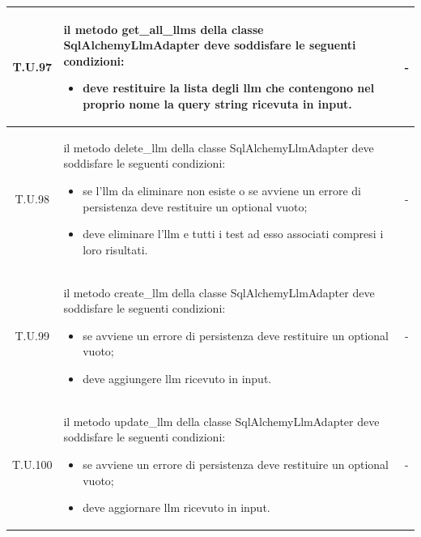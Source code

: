 \begin{tabularx}{\textwidth}{|c|X|c|}
    \hline 
    \label{tu:tu97} T.U.97 & il metodo get\_all\_llms della classe SqlAlchemyLlmAdapter deve soddisfare le seguenti condizioni:
    \begin{itemize}
        \item deve restituire la lista degli llm che contengono nel proprio nome la query string ricevuta in input. 
    \end{itemize} & - \\
    \hline 
    \label{tu:tu98} T.U.98 & il metodo delete\_llm della classe SqlAlchemyLlmAdapter deve soddisfare le seguenti condizioni:
    \begin{itemize}
        \item se l'llm da eliminare non esiste o se avviene un errore di persistenza deve restituire un optional vuoto;
        \item deve eliminare l'llm e tutti i test ad esso associati compresi i loro risultati. 
    \end{itemize} & - \\
    \hline 
    \label{tu:tu99} T.U.99 & il metodo create\_llm della classe SqlAlchemyLlmAdapter deve soddisfare le seguenti condizioni:
    \begin{itemize}
        \item se avviene un errore di persistenza deve restituire un optional vuoto;
        \item deve aggiungere llm ricevuto in input.
    \end{itemize} & - \\
    \hline 
    \label{tu:tu100} T.U.100 & il metodo update\_llm della classe SqlAlchemyLlmAdapter deve soddisfare le seguenti condizioni:
    \begin{itemize}
        \item se avviene un errore di persistenza deve restituire un optional vuoto;
        \item deve aggiornare llm ricevuto in input.
    \end{itemize} & - \\
    \hline 
\end{tabularx}